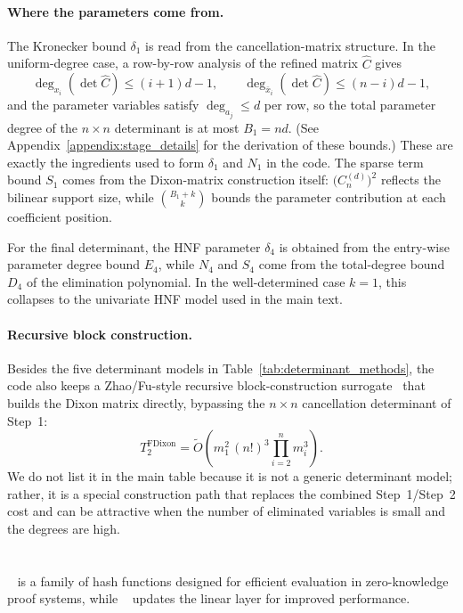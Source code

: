 \paragraph{Where the parameters come from.}
The Kronecker bound $\delta_1$ is read from the cancellation-matrix structure. In the uniform-degree case, a row-by-row analysis of the refined matrix $\widehat{C}$ gives
\[
\deg_{x_i}(\det\widehat{C})\le (i+1)d-1,
\qquad
\deg_{\bar{x}_i}(\det\widehat{C})\le (n-i)d-1,
\]
and the parameter variables satisfy $\deg_{a_j}\le d$ per row, so the total parameter degree of the $n\times n$ determinant is at most $B_1=nd$. (See Appendix~\ref{appendix:stage_details} for the derivation of these bounds.) These are exactly the ingredients used to form $\delta_1$ and $N_1$ in the code. The sparse term bound $S_1$ comes from the Dixon-matrix construction itself: $\bigl(C_n^{(d)}\bigr)^2$ reflects the bilinear support size, while $\binom{B_1+k}{k}$ bounds the parameter contribution at each coefficient position.

For the final determinant, the HNF parameter $\delta_4$ is obtained from the entry-wise parameter degree bound $E_4$, while $N_4$ and $S_4$ come from the total-degree bound $D_4$ of the elimination polynomial. In the well-determined case $k=1$, this collapses to the univariate HNF model used in the main text.

\paragraph{Recursive block construction.}
Besides the five determinant models in Table~\ref{tab:determinant_methods}, the code also keeps a Zhao/Fu-style recursive block-construction surrogate~\cite{Zhao2005extfast,DBLP:journals/ijcm/QinWTJ17} that builds the Dixon matrix directly, bypassing the $n\times n$ cancellation determinant of Step~1:
\[
T_{2}^{\mathrm{FDixon}}=\widetilde{O}\!\left(m_1^2\,(n!)^3\prod_{i=2}^{n}m_i^3\right).
\]
We do not list it in the main table because it is not a generic determinant model; rather, it is a special construction path that replaces the combined Step~1/Step~2 cost and can be attractive when the number of eliminated variables is small and the degrees are high.

\newpage
\section{\texorpdfstring{\poseidon}{Poseidon}}
\label{appendix:poseidon}

\poseidon~\cite{DBLP:conf/uss/0001KR0S21} is a family of hash functions designed for efficient evaluation in zero-knowledge proof systems, while \poseidonnew~\cite{DBLP:conf/africacrypt/GrassiKS23} updates the linear layer for improved performance.

